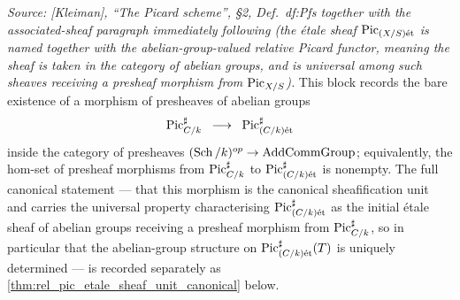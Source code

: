 \begin{theorem}\leanok
  \label{thm:rel_pic_etale_sheaf_group_structure}

  \textit{Source: [Kleiman], ``The Picard scheme'', \S 2,
  Def.~df:Pfs together with the associated-sheaf paragraph immediately
  following (the \'etale sheaf \(\operatorname{Pic}_{(X/S)\mathrm{\acute{e}t}}\) is named together with the
  abelian-group-valued relative Picard functor, meaning the sheaf is taken in
  the category of abelian groups, and is universal among such sheaves
  receiving a presheaf morphism from \(\operatorname{Pic}_{X/S}\)).}
  This block records the bare existence of a morphism of presheaves of
  abelian groups
  \[
    \operatorname{Pic}^\sharp_{C/k} \;\;\longrightarrow\;\;
    \operatorname{Pic}^\sharp_{(C/k)\mathrm{\acute{e}t}}
  \]
  inside the category of presheaves
  \((\operatorname{Sch}/k)^{op} \to \mathrm{AddCommGroup}\); equivalently, the hom-set of
  presheaf morphisms from \(\operatorname{Pic}^\sharp_{C/k}\) to
  \(\operatorname{Pic}^\sharp_{(C/k)\mathrm{\acute{e}t}}\) is nonempty. The full canonical statement
  --- that this morphism is the canonical sheafification unit and
  carries the universal property characterising
  \(\operatorname{Pic}^\sharp_{(C/k)\mathrm{\acute{e}t}}\) as the initial \'etale sheaf of abelian
  groups receiving a presheaf morphism from \(\operatorname{Pic}^\sharp_{C/k}\), so
  in particular that the abelian-group structure on
  \(\operatorname{Pic}^\sharp_{(C/k)\mathrm{\acute{e}t}}(T)\) is uniquely determined --- is recorded
  separately as \cref{thm:rel_pic_etale_sheaf_unit_canonical} below.
\end{theorem}


